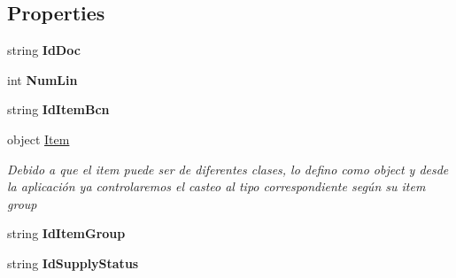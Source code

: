 \subsection*{Properties}
\begin{DoxyCompactItemize}
\item 
\mbox{\label{class_h_k_supply_1_1_models_1_1_supply_1_1_doc_line_afbc63791ed8de175403fce640f99a375}} 
string {\bfseries Id\+Doc}
\item 
\mbox{\label{class_h_k_supply_1_1_models_1_1_supply_1_1_doc_line_a115c09205cd8113d191492c5191a695f}} 
int {\bfseries Num\+Lin}
\item 
\mbox{\label{class_h_k_supply_1_1_models_1_1_supply_1_1_doc_line_a97c39e7b5e0fa047ab525693a2ef84a8}} 
string {\bfseries Id\+Item\+Bcn}
\item 
object \mbox{\hyperlink{class_h_k_supply_1_1_models_1_1_supply_1_1_doc_line_a2906a81d728477297e382ea387d92f33}{Item}}
\begin{DoxyCompactList}\small\item\em Debido a que el item puede ser de diferentes clases, lo defino como object y desde la aplicación ya controlaremos el casteo al tipo correspondiente según su item group \end{DoxyCompactList}\item 
\mbox{\label{class_h_k_supply_1_1_models_1_1_supply_1_1_doc_line_aea0b697eff58572777c5f37cf01b6c73}} 
string {\bfseries Id\+Item\+Group}
\item 
\mbox{\label{class_h_k_supply_1_1_models_1_1_supply_1_1_doc_line_aae61886662cbcca15b7269feaf333005}} 
string {\bfseries Id\+Supply\+Status}

\end{DoxyCompactItemize}
